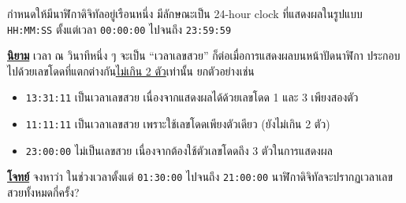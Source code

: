 \question{}

กำหนดให้มีนาฬิกาดิจิทัลอยู่เรือนหนึ่ง มีลักษณะเป็น 24-hour clock
ที่แสดงผลในรูปแบบ \texttt{HH:MM:SS} ตั้งแต่เวลา \texttt{00:00:00} ไปจนถึง \texttt{23:59:59}

\medskip\noindent
\textbf{\uline{นิยาม}}\;
เวลา ณ วินาทีหนึ่ง ๆ จะเป็น ``เวลาเลขสวย'' ก็ต่อเมื่อการแสดงผลบนหน้าปัดนาฬิกา%
ประกอบไปด้วยเลขโดดที่แตกต่างกัน\uline{ไม่เกิน 2 ตัว}เท่านั้น ยกตัวอย่างเช่น
\begin{itemize}[before*=\small]
\item \texttt{13:31:11} เป็นเวลาเลขสวย เนื่องจากแสดงผลได้ด้วยเลขโดด 1 และ 3 เพียงสองตัว
\item \texttt{11:11:11} เป็นเวลาเลขสวย เพราะใช้เลขโดดเพียงตัวเดียว (ยังไม่เกิน 2 ตัว)
\item \texttt{23:00:00} ไม่เป็นเลขสวย เนื่องจากต้องใช้ตัวเลขโดดถึง 3 ตัวในการแสดงผล
\end{itemize}

\noindent
\textbf{\uline{โจทย์}}\;
จงหาว่า ในช่วงเวลาตั้งแต่ \texttt{01:30:00} ไปจนถึง \texttt{21:00:00} 
นาฬิกาดิจิทัลจะปรากฏเวลาเลขสวยทั้งหมดกี่ครั้ง?
